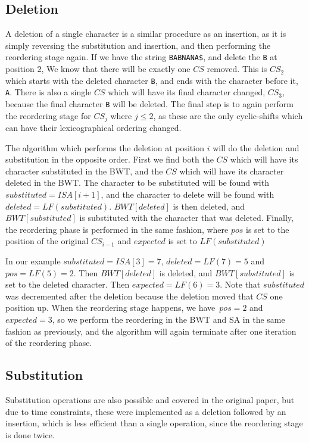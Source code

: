 \subsection*{Deletion}

A deletion of a single character is a similar procedure as an insertion, as it is simply
reversing the substitution and insertion, and then performing the reordering stage again.
If we have the string \verb|BABNANA$|, and delete the \verb|B| at position $2$, We know
that there will be exactly one $CS$ removed. This is $CS_2$ which starts with the deleted
character \verb|B|, and ends with the character before it, \verb|A|. There is also a
single $CS$ which will have its final character changed, $CS_3$, because the final
character \verb|B| will be deleted. The final step is to again perform the reordering
stage for $CS_j$ where $j \leq 2$, as these are the only cyclic-shifts which can have
their lexicographical ordering changed.

The algorithm which performs the deletion at position $i$ will do the deletion and
substitution in the opposite order. First we find both the $CS$ which will have its
character substituted in the BWT, and the $CS$ which will have its character deleted in
the BWT. The character to be substituted will be found with $substituted = ISA[i + 1]$,
and the character to delete will be found with $deleted = LF(substituted)$. $BWT[deleted]$
is then deleted, and $BWT[substituted]$ is substituted with the character that was
deleted. Finally, the reordering phase is performed in the same fashion, where $pos$ is
set to the position of the original $CS_{i - 1}$ and $expected$ is set to $LF(substituted)$

In our example $substituted = ISA[3] = 7$, $deleted = LF(7) = 5$ and $pos = LF(5) = 2$.
Then $BWT[deleted]$ is deleted, and $BWT[substituted]$ is set to the deleted character.
Then $expected = LF(6) = 3$. Note that $substituted$ was decremented after the deletion
because the deletion moved that $CS$ one position up. When the reordering stage happens,
we have $pos = 2$ and $expected = 3$, so we perform the reordering in the BWT and SA in the
same fashion as previously, and the algorithm will again terminate after one iteration of
the reordering phase.

\subsection*{Substitution}

Substitution operations are also possible and covered in the original paper, but due to
time constraints, these were implemented as a deletion followed by an insertion, which is
less efficient than a single operation, since the reordering stage is done twice.

